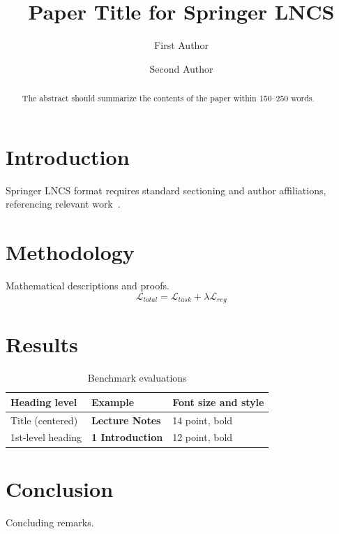 \documentclass{llncs}
\begin{document}
\title{Paper Title for Springer LNCS}

\author{First Author \and
Second Author}



\maketitle

\begin{abstract}
The abstract should summarize the contents of the paper within 150--250 words.

\end{abstract}

\section{Introduction}
Springer LNCS format requires standard sectioning and author affiliations, referencing relevant work~\cite{sample}.

\section{Methodology}
Mathematical descriptions and proofs.
\begin{equation}
\mathcal{L}_{total} = \mathcal{L}_{task} + \lambda \mathcal{L}_{reg}
\end{equation}

\section{Results}
\begin{table}[ht]
\centering
\caption{Benchmark evaluations}\label{tab1}
\begin{tabular}{lll}
\hline
Heading level & Example & Font size and style\\
\hline
Title (centered) & {\Large\bfseries Lecture Notes} & 14 point, bold\\
1st-level heading & {\large\bfseries 1 Introduction} & 12 point, bold\\
\hline
\end{tabular}
\end{table}

\section{Conclusion}
Concluding remarks.



\end{document}
